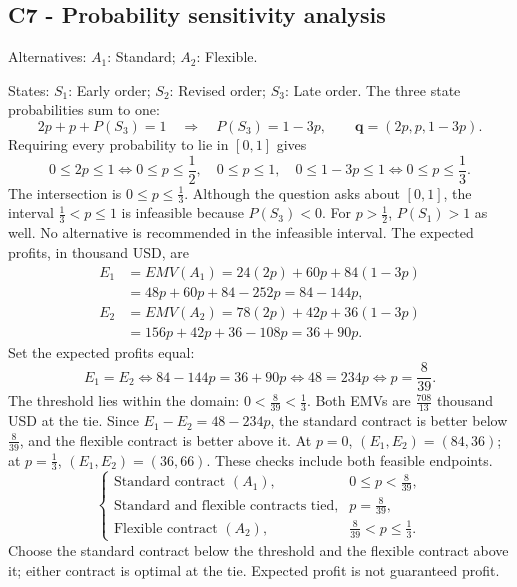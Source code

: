 \subsection*{C7 - Probability sensitivity analysis }
\label{sol:printing-contract-c7}
Alternatives: $A_1$: Standard; $A_2$: Flexible.\par
States: $S_1$: Early order; $S_2$: Revised order; $S_3$: Late order.
The three state probabilities sum to one:
\[
2p+p+P(S_3)=1\quad\Longrightarrow\quad
P(S_3)=1-3p,\qquad \boldsymbol{q}=(2p,p,1-3p).
\]
Requiring every probability to lie in $[0,1]$ gives
\[
0\le2p\le1\iff0\le p\le\frac12,\quad
0\le p\le1,\quad
0\le1-3p\le1\iff0\le p\le\frac13.
\]
The intersection is $\boxed{0\le p\le\frac13}$.
Although the question asks about $[0,1]$, the interval
$\frac13<p\le1$ is infeasible because $P(S_3)<0$.
For $p>\frac12$, $P(S_1)>1$ as well. No alternative is recommended in the infeasible interval.
The expected profits, in thousand USD, are
\begin{align*}
E_1&=EMV(A_1)=24(2p)+60p+84(1-3p)\\
&=48p+60p+84-252p=84-144p,\\
E_2&=EMV(A_2)=78(2p)+42p+36(1-3p)\\
&=156p+42p+36-108p=36+90p.
\end{align*}
Set the expected profits equal:
\[
E_1=E_2\iff84-144p=36+90p\iff48=234p
\iff\boxed{p=\frac8{39}}.
\]
The threshold lies within the domain: $0<\frac8{39}<\frac13$.
Both EMVs are $\frac{708}{13}$ thousand USD at the tie.
Since $E_1-E_2=48-234p$, the standard contract is better below $\frac8{39}$,
and the flexible contract is better above it.
At $p=0$, $(E_1,E_2)=(84,36)$; at $p=\frac13$, $(E_1,E_2)=(36,66)$.
These checks include both feasible endpoints.
\[
\boxed{\begin{cases}
\text{Standard contract }(A_1),&0\le p<\frac8{39},\\
\text{Standard and flexible contracts tied},&p=\frac8{39},\\
\text{Flexible contract }(A_2),&\frac8{39}<p\le\frac13.
\end{cases}}
\]
Choose the standard contract below the threshold and the flexible contract above it;
either contract is optimal at the tie. Expected profit is not guaranteed profit.

